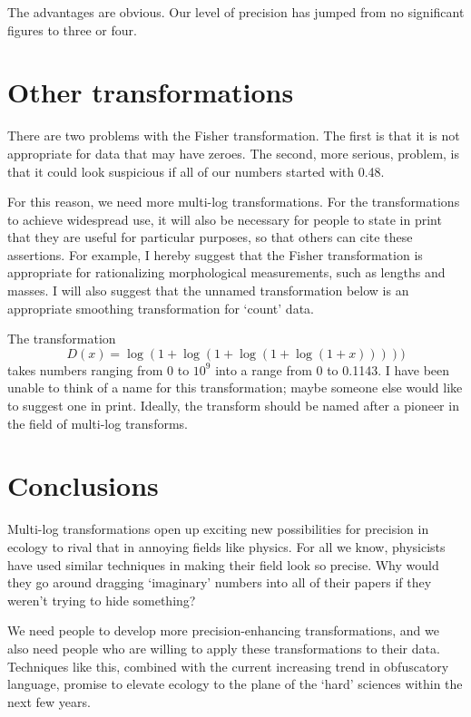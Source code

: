 The advantages are obvious.  Our level of precision has jumped from no
significant figures to three or four.

\section {Other transformations}

There are two problems with the Fisher transformation.  The first is that
it is not appropriate for data that may have zeroes.  The second, more
serious, problem, is that it could look suspicious if all of our numbers
started with 0.48.

For this reason, we need more multi-log transformations.  For the
transformations to achieve widespread use, it will also be necessary for
people to state in print that they are useful for particular purposes, so
that others can cite these assertions.  For example, I hereby suggest that
the Fisher transformation is appropriate for rationalizing morphological
measurements, such as lengths and masses.  I will also suggest that the
unnamed transformation below is an appropriate smoothing transformation for
`count' data.

The transformation 
$$ 
	D(x) = \log(1+\log(1+\log(1+\log(1+x)))))
$$
takes numbers ranging from 0 to $10^9$ into a range from 0 to 0.1143.  I
have been unable to think of a name for this transformation; maybe someone
else would like to suggest one in print.  Ideally, the transform should be
named after a pioneer in the field of multi-log transforms.

\section {Conclusions}

Multi-log transformations open up exciting new possibilities for precision
in ecology to rival that in annoying fields like physics.  For all we know,
physicists have used similar techniques in making their field look so
precise.  Why would they go around dragging `imaginary' numbers into all of
their papers if they weren't trying to hide something?  

We need people to develop more precision-enhancing transformations, and we
also need people who are willing to apply these transformations to their
data.  Techniques like this, combined with the current increasing trend in
obfuscatory language, promise to elevate ecology to the plane of the `hard'
sciences within the next few years.
